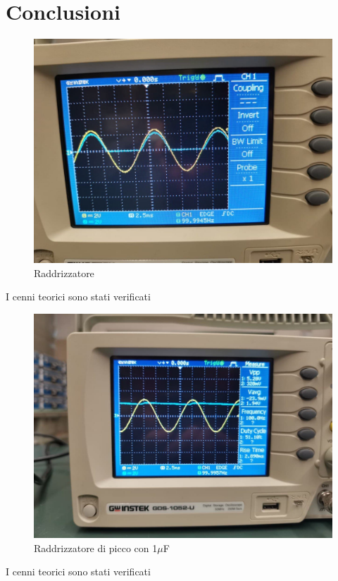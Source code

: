 \documentclass[12pt]{article}
\begin{document}
    \section{Conclusioni}
    \begin{figure}[H]
        \centering
        \includegraphics[scale=0.1]{media/r-1s-osc.jpg}       
        \caption{Raddrizzatore}   
    \end{figure}
    I cenni teorici sono stati verificati
    \begin{figure}[H]
        \centering
        \includegraphics[scale=0.1]{media/rc-1.jpg}
        \caption{Raddrizzatore di picco con 1$\mu$F}          
    \end{figure}
    I cenni teorici sono stati verificati
\end{document}
